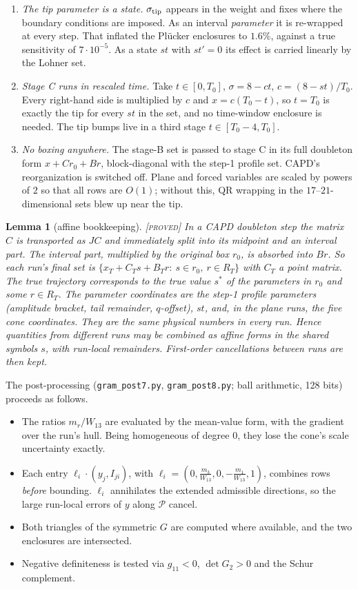 \documentclass[11pt]{amsart}
\newtheorem{lemma}[theorem]{Lemma}
\theoremstyle{definition}
\theoremstyle{remark}
\newcommand{\lab}[1]{\textup{\textsc{[#1]}}}
\newcommand{\stip}{\sigma_{\rm tip}}
\begin{document}
\begin{enumerate}
\item \emph{The tip parameter is a state.} $\stip$ appears in the weight and fixes where the boundary conditions are imposed. As an interval \emph{parameter} it is re-wrapped at every step. That inflated the Pl\"ucker enclosures to $1.6\%$, against a true sensitivity of $7\cdot10^{-5}$. As a state $st$ with $st'=0$ its effect is carried linearly by the Lohner set.
\item \emph{Stage C runs in rescaled time.} Take $t\in[0,T_0]$, $\sigma=8-ct$, $c=(8-st)/T_0$. Every right-hand side is multiplied by $c$ and $x=c(T_0-t)$, so $t=T_0$ is exactly the tip for every $st$ in the set, and no time-window enclosure is needed. The tip bumps live in a third stage $t\in[T_0-4,T_0]$.
\item \emph{No boxing anywhere.} The stage-B set is passed to stage C in its full doubleton form $x+Cr_0+Br$, block-diagonal with the step-1 profile set. CAPD's reorganization is switched off. Plane and forced variables are scaled by powers of $2$ so that all rows are $O(1)$; without this, QR wrapping in the $17$--$21$-dimensional sets blew up near the tip.
\end{enumerate}

\begin{lemma}[affine bookkeeping]\label{lem:affine}\lab{proved}
In a CAPD doubleton step the matrix $C$ is transported as $J C$ and immediately split into its midpoint and an interval part. The interval part, multiplied by the \emph{original} box $r_0$, is absorbed into $Br$. So each run's final set is $\{x_T+C_Ts+B_Tr:\ s\in r_0,\ r\in R_T\}$ with $C_T$ a point matrix. The true trajectory corresponds to the true value $s^*$ of the parameters in $r_0$ and some $r\in R_T$. The parameter coordinates are the step-1 profile parameters (amplitude bracket, tail remainder, $q$-offset), $st$, and, in the plane runs, the five cone coordinates. They are the same physical numbers in every run. Hence quantities from different runs may be combined as affine forms in the shared symbols $s$, with run-local remainders. First-order cancellations between runs are then kept.
\end{lemma}

The post-processing (\texttt{gram\_post7.py}, \texttt{gram\_post8.py}; ball arithmetic, 128 bits) proceeds as follows.
\begin{itemize}
\item The ratios $m_r/W_{13}$ are evaluated by the mean-value form, with the gradient over the run's hull. Being homogeneous of degree $0$, they lose the cone's scale uncertainty exactly.
\item Each entry $\ell_i\cdot(y_j,I_{ji})$, with $\ell_i=(0,\frac{m_3}{W_{13}},0,-\frac{m_1}{W_{13}},1)$, combines rows \emph{before} bounding. $\ell_i$ annihilates the extended admissible directions, so the large run-local errors of $y$ along $\mathcal P$ cancel.
\item Both triangles of the symmetric $G$ are computed where available, and the two enclosures are intersected.
\item Negative definiteness is tested via $g_{11}<0$, $\det G_2>0$ and the Schur complement.
\end{itemize}
\end{document}
